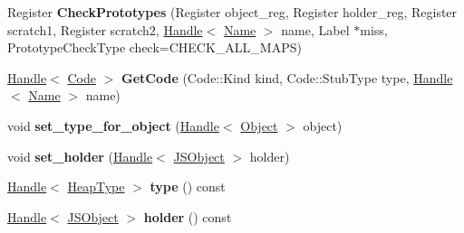 \begin{DoxyCompactItemize}
\item 
\hypertarget{classv8_1_1internal_1_1_property_handler_compiler_a789c3008a301a12b9f38b15f8e561500}{}Register {\bfseries Check\+Prototypes} (Register object\+\_\+reg, Register holder\+\_\+reg, Register scratch1, Register scratch2, \hyperlink{classv8_1_1internal_1_1_handle}{Handle}$<$ \hyperlink{classv8_1_1internal_1_1_name}{Name} $>$ name, Label $\ast$miss, Prototype\+Check\+Type check=C\+H\+E\+C\+K\+\_\+\+A\+L\+L\+\_\+\+M\+A\+P\+S)\label{classv8_1_1internal_1_1_property_handler_compiler_a789c3008a301a12b9f38b15f8e561500}

\item 
\hypertarget{classv8_1_1internal_1_1_property_handler_compiler_a941a852e0c3bcb99659ae53b2cc74f18}{}\hyperlink{classv8_1_1internal_1_1_handle}{Handle}$<$ \hyperlink{classv8_1_1internal_1_1_code}{Code} $>$ {\bfseries Get\+Code} (Code\+::\+Kind kind, Code\+::\+Stub\+Type type, \hyperlink{classv8_1_1internal_1_1_handle}{Handle}$<$ \hyperlink{classv8_1_1internal_1_1_name}{Name} $>$ name)\label{classv8_1_1internal_1_1_property_handler_compiler_a941a852e0c3bcb99659ae53b2cc74f18}

\item 
\hypertarget{classv8_1_1internal_1_1_property_handler_compiler_a374b4635d65a52817da57deaac557bd2}{}void {\bfseries set\+\_\+type\+\_\+for\+\_\+object} (\hyperlink{classv8_1_1internal_1_1_handle}{Handle}$<$ \hyperlink{classv8_1_1internal_1_1_object}{Object} $>$ object)\label{classv8_1_1internal_1_1_property_handler_compiler_a374b4635d65a52817da57deaac557bd2}

\item 
\hypertarget{classv8_1_1internal_1_1_property_handler_compiler_aea9ee9652675a3c91401f1df943bbcd0}{}void {\bfseries set\+\_\+holder} (\hyperlink{classv8_1_1internal_1_1_handle}{Handle}$<$ \hyperlink{classv8_1_1internal_1_1_j_s_object}{J\+S\+Object} $>$ holder)\label{classv8_1_1internal_1_1_property_handler_compiler_aea9ee9652675a3c91401f1df943bbcd0}

\item 
\hypertarget{classv8_1_1internal_1_1_property_handler_compiler_a86682f61f51c5d5d439b29278a100cfa}{}\hyperlink{classv8_1_1internal_1_1_handle}{Handle}$<$ \hyperlink{classv8_1_1internal_1_1_type_impl}{Heap\+Type} $>$ {\bfseries type} () const \label{classv8_1_1internal_1_1_property_handler_compiler_a86682f61f51c5d5d439b29278a100cfa}

\item 
\hypertarget{classv8_1_1internal_1_1_property_handler_compiler_a3c05a2ca79df15bd7d38772cacf59eca}{}\hyperlink{classv8_1_1internal_1_1_handle}{Handle}$<$ \hyperlink{classv8_1_1internal_1_1_j_s_object}{J\+S\+Object} $>$ {\bfseries holder} () const \label{classv8_1_1internal_1_1_property_handler_compiler_a3c05a2ca79df15bd7d38772cacf59eca}

\end{DoxyCompactItemize}
